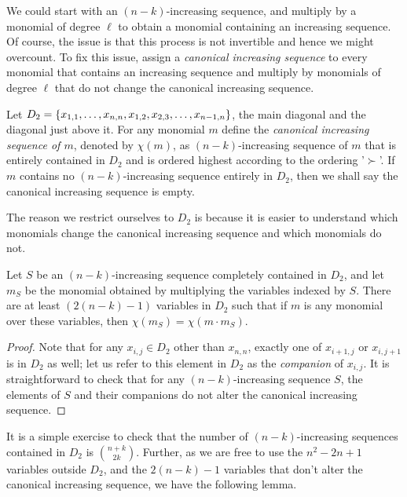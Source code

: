 \documentclass[12pt]{report}
\begin{document}
We could start with an $(n-k)$-increasing sequence, and multiply by a monomial of degree $\ell$ to obtain a monomial containing an increasing sequence. Of course, the issue is that this process is not invertible and hence we might overcount. To fix this issue, \cite{gkks13} assign a \emph{canonical increasing sequence} to every monomial that contains an increasing sequence and multiply by monomials of degree $\ell$ that do not change the canonical increasing sequence. 

\begin{definition}
Let $D_2 = \left\{x_{1,1},\dots, x_{n,n}, x_{1,2},x_{2,3}, \dots, x_{n-1,n}\right\}$, the main diagonal and the diagonal just above it. For any monomial $m$ define the \emph{canonical increasing sequence of $m$}, denoted by $\chi(m)$, as $(n-k)$-increasing sequence of $m$ that is entirely contained in $D_2$ and is ordered highest according to the ordering '$\succ$'. If $m$ contains no $(n-k)$-increasing sequence entirely in $D_2$, then we shall say the canonical increasing sequence is empty. 
\end{definition}

The reason we restrict ourselves to $D_2$ is because it is easier to understand which monomials change the canonical increasing sequence and which monomials do not. 

\begin{lemma}\label{lem:forbidden-variables}
Let $S$ be an $(n-k)$-increasing sequence completely contained in $D_2$, and let $m_S$ be the monomial obtained by multiplying the variables indexed by $S$. There are at least $(2(n-k)-1)$ variables in $D_2$ such that if $m$ is any monomial over these variables, then $\chi(m_S) = \chi(m\cdot m_S)$. 
\end{lemma}
\begin{proof}
Note that for any $x_{i,j} \in D_2$ other than $x_{n,n}$, exactly one of $x_{i+1,j}$ or $x_{i,j+1}$ is in $D_2$ as well; let us refer to this element in $D_2$ as the \emph{companion} of $x_{i,j}$.  It is straightforward to check that for any $(n-k)$-increasing sequence $S$, the elements of $S$ and their companions do not alter the canonical increasing sequence. 
\end{proof}

It is a simple exercise to check that the number of $(n-k)$-increasing sequences contained in $D_2$ is $\binom{n+k}{2k}$. Further, as we are free to use the $n^2 - 2n + 1$ variables outside $D_2$, and the $2(n-k) -1$ variables that don't alter the canonical increasing sequence, we have the following lemma. 
\end{document}

